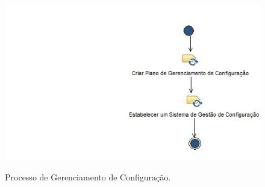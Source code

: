 \begin{figure}[h]
\centering
\caption[Processo de Gerenciamento de Configuração]{Processo de Gerenciamento de Configuração.}
\includegraphics[scale=0.7]{./images/processonpi}
\label{fig:procnpi}
\end{figure}